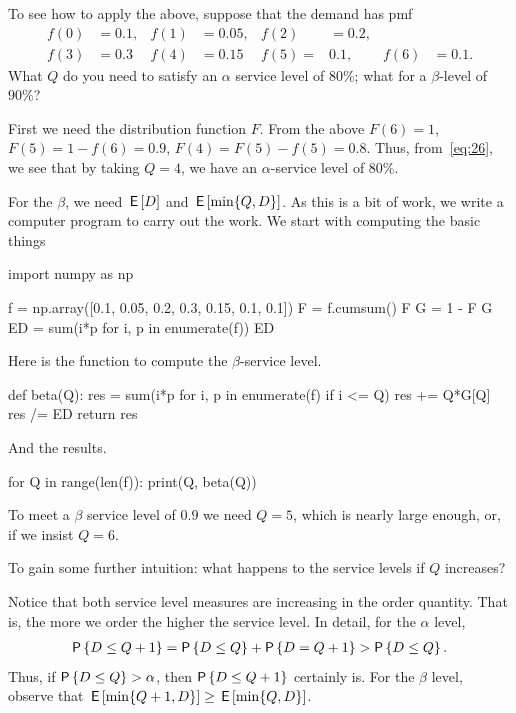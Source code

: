 \begin{exercise}
To see how to apply the above, suppose that the demand has pmf
\begin{align*}
 f(0)&=0.1, &f(1)&=0.05, &f(2)&=0.2, \\
f(3) &= 0.3 & f(4) &= 0.15 & f(5)=& 0.1, &f(6)&=0.1.
\end{align*}
What $Q$ do you need to satisfy an $\alpha$ service level of 80\%; what for a $\beta$-level of $90\%$?
\begin{solution}
First we need the distribution function $F$. From the above
$F(6)=1$, $F(5)=1-f(6) = 0.9$, $F(4)=F(5)-f(5) = 0.8$. Thus, from~\eqref{eq:26}, we see that by taking $Q=4$, we have an $\alpha$-service level of 80\%.

For the $\beta$, we need $\,\mathsf{E}\left[D\right]$ and $\,\mathsf{E}\left[\min\{Q, D\}\right]$. As this is a bit of work, we write a computer program to carry out the work. We start with computing the basic things
\begin{pyconsole} 
import numpy as np

f = np.array([0.1, 0.05, 0.2, 0.3, 0.15, 0.1, 0.1])
F = f.cumsum()
F
G = 1 - F
G
ED = sum(i*p for i, p in enumerate(f))
ED
\end{pyconsole}

Here is the function to compute the $\beta$-service level.
\begin{pyconsole}
def beta(Q):
    res = sum(i*p for i, p in enumerate(f) if i <= Q)
    res += Q*G[Q]
    res /= ED
    return res
    
\end{pyconsole}
And the results.
\begin{pyconsole}
for Q in range(len(f)):
    print(Q, beta(Q))
    
\end{pyconsole}
To meet a $\beta$ service level of $0.9$ we need  $Q=5$, which is nearly large enough, or, if we insist $Q=6$. 
\end{solution}
\end{exercise}

\begin{exercise}
To gain some further intuition:  what happens to the service levels if $Q$ increases?
  \begin{solution}
Notice that both service level measures are increasing in the order quantity. That is, the more we order the higher the service level. In detail, for the $\alpha$ level,
\begin{align*}
  \P{D\leq Q+1} = \P{D\leq Q} + \P{D=Q+1} > \P{D \leq Q}.
\end{align*}
Thus, if $\P{D\leq Q} > \alpha$, then $\P{D\leq Q+1}$ certainly is. For the $\beta$ level, observe that $\,\mathsf{E}\left[\min\{Q+1, D\}\right] \geq \,\mathsf{E}\left[\min\{Q, D\}\right]$. 
  \end{solution}
\end{exercise}


